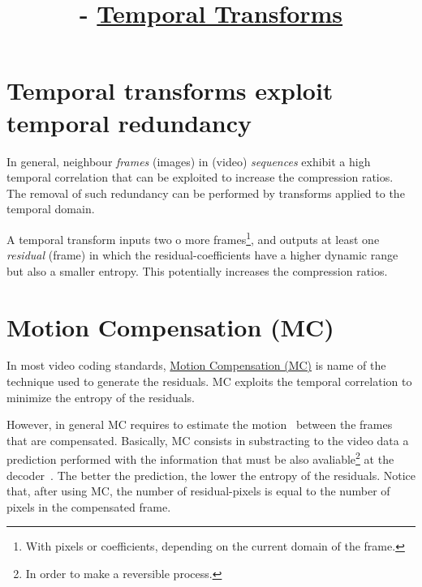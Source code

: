 


\title{\SM{} - \href{https://github.com/Sistemas-Multimedia/Sistemas-Multimedia.github.io/tree/master/contents/temporal_transforms}{Temporal Transforms}}

\maketitle
\tableofcontents

\section{Temporal transforms exploit temporal redundancy}

In general, neighbour \emph{frames} (images) in (video)
\emph{sequences} exhibit a high temporal correlation that can be
exploited to increase the compression ratios. The removal of such
redundancy can be performed by transforms applied to the temporal
domain.

A temporal transform inputs two o more frames\footnote{With pixels or
coefficients, depending on the current domain of the frame.}, and
outputs at least one \emph{residual} (frame) in which the
residual-coefficients have a higher dynamic range but also a smaller
entropy. This potentially increases the compression ratios.


\section{Motion Compensation (MC)}

In most video coding standards,
\href{https://en.wikipedia.org/wiki/Motion_compensation}{Motion
  Compensation (MC)} is name of the technique used to generate the
residuals. MC exploits the temporal correlation to minimize the
entropy of the residuals.

However, in general MC requires to estimate the
motion~\cite{vruiz__ME} between the frames that are
compensated. Basically, MC consists in substracting to the video data
a prediction performed with the information that must be also
avaliable\footnote{In order to make a reversible process.} at the
decoder~\cite{vruiz__MCT}. The better the prediction, the lower the
entropy of the residuals. Notice that, after using MC, the number of
residual-pixels is equal to the number of pixels in the compensated
frame.

